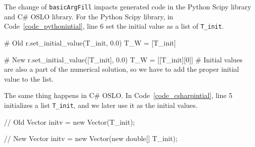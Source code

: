 




The change of \verb|basicArgFill| impacts generated code in the Python Scipy library and C\# OSLO library. For the Python Scipy library, in Code~\ref{code_pythonintial}, line 6 set the initial value as a list of \verb|T_init|.

\begin{listing}
\begin{python1}
# Old 
  r.set_initial_value(T_init, 0.0)
  T_W = [T_init]

# New 
  r.set_initial_value([T_init], 0.0)
  T_W = [[T_init][0]] # Initial values are also a part of the numerical solution, so we have to add the proper initial value to the list.
\end{python1}
\label{code_pythonintial}
\end{listing}
The same thing happens in C\# OSLO. In Code~\ref{code_csharpintial}, line 5 initializes a list \verb|T_init|, and we later use it as the initial values.  
\begin{listing}[ht]
\begin{csharp1}
// Old 
Vector initv = new Vector(T_init);

// New 
Vector initv = new Vector(new double[] {T_init});
\end{csharp1}
\label{code_csharpintial}
\end{listing}

